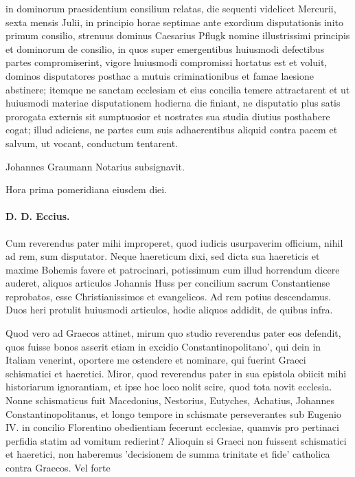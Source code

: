 in dominorum praesidentium consilium relatas, die sequenti videlicet Mercurii, sexta mensis Julii, in principio horae septimae ante exordium disputationis inito primum consilio, strenuus dominus Caesarius Pflugk nomine illustrissimi principis et dominorum de consilio, in quos super emergentibus huiusmodi defectibus partes compromiserint, vigore huiusmodi compromissi hortatus est et voluit, dominos disputatores posthac a mutuis criminationibus et famae laesione abstinere; itemque ne sanctam ecclesiam et eius concilia temere attractarent et ut huiusmodi materiae disputationem hodierna die finiant, ne disputatio plus satis prorogata externis sit sumptuosior et nostrates sua studia diutius posthabere cogat; illud adiciens, ne partes cum suis adhaerentibus aliquid contra pacem et salvum, ut vocant, conductum tentarent.

Johannes Graumann Notarius subsignavit.

Hora prima pomeridiana eiusdem diei.

\paragraph*{D. D. Eccius.}

Cum reverendus pater mihi improperet, quod iudicis usurpaverim officium, nihil ad rem, sum disputator. Neque haereticum dixi, sed dicta sua haereticis et maxime Bohemis favere et patrocinari, potissimum cum illud horrendum dicere auderet, aliquos articulos Johannis Huss per concilium sacrum Constantiense reprobatos, esse Christianissimos et evangelicos. Ad rem potius descendamus. Duos heri protulit huiusmodi articulos, hodie aliquos addidit, de quibus infra.

Quod vero ad Graecos attinet, mirum quo studio reverendus pater eos defendit, quos fuisse bonos asserit etiam in excidio Constantinopolitano', qui dein in Italiam venerint, oportere me ostendere et nominare, qui fuerint Graeci schismatici et haeretici. Miror, quod reverendus pater in sua epistola obiicit mihi historiarum ignorantiam, et ipse hoc loco nolit scire, quod tota novit ecclesia. Nonne schismaticus fuit Macedonius, Nestorius, Eutyches, Achatius, Johannes Constantinopolitanus, et longo tempore in schismate perseverantes sub Eugenio IV. in concilio Florentino obedientiam fecerunt ecclesiae, quamvis pro pertinaci perfidia statim ad vomitum redierint? Alioquin si Graeci non fuissent schismatici et haeretici, non haberemus 'decisionem de summa trinitate et fide' catholica contra Graecos. Vel forte

